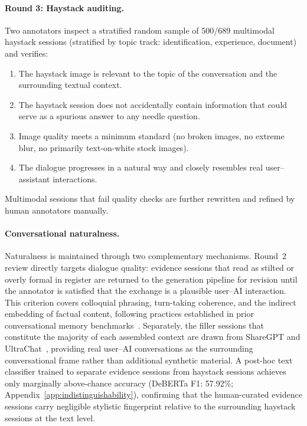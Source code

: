 \documentclass{article}
\begin{document}
\paragraph{Round 3: Haystack auditing.}
Two annotators inspect a stratified random sample of 500/689 multimodal haystack sessions (stratified by topic track: identification, experience, document) and verifies:
\begin{enumerate}
    \item The haystack image is relevant to the topic of the conversation and the surrounding textual context.
    \item The haystack session does not accidentally contain information that could serve as a spurious answer to any needle question.
    \item Image quality meets a minimum standard (no broken images, no extreme blur, no primarily text-on-white stock images).
    \item The dialogue progresses in a natural way and closely resembles real user–assistant interactions.
\end{enumerate}
Multimodal sessions that fail quality checks are further rewritten and refined by human annotators manually.

\paragraph{Conversational naturalness.}
Naturalness is maintained through two complementary mechanisms. Round~2 review directly targets dialogue quality: evidence sessions that read as stilted or overly formal in register are returned to the generation pipeline for revision until the annotator is satisfied that the exchange is a plausible user--AI interaction. This criterion covers colloquial phrasing, turn-taking coherence, and the indirect embedding of factual content, following practices established in prior conversational memory benchmarks~\cite{wu2025longmemevalbenchmarkingchatassistants}. Separately, the filler sessions that constitute the majority of each assembled context are drawn from ShareGPT and UltraChat~\cite{ding2023enhancing}, providing real user--AI conversations as the surrounding conversational frame rather than additional synthetic material. A post-hoc text classifier trained to separate evidence sessions from haystack sessions achieves only marginally above-chance accuracy (DeBERTa F1: 57.92\%; Appendix~\ref{app:indistinguishability}), confirming that the human-curated evidence sessions carry negligible stylistic fingerprint relative to the surrounding haystack sessions at the text level.
\end{document}
